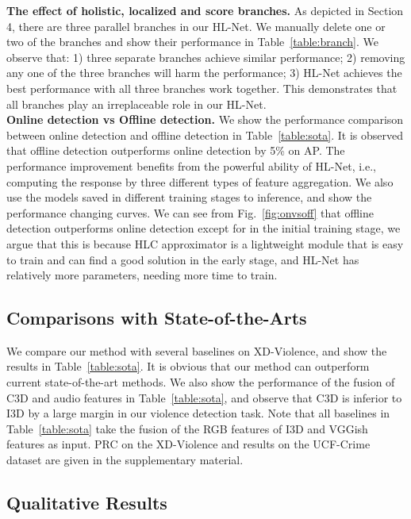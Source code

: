 \documentclass[runningheads]{llncs}
\begin{document}
\noindent\textbf{The effect of holistic, localized and score branches.} As depicted in Section 4, there are three parallel branches in our HL-Net. We manually delete one or two of the branches and show their performance in Table~\ref{table:branch}. We observe that: 1) three separate branches achieve similar performance; 2) removing any one of the three branches will harm the performance; 3) HL-Net achieves the best performance with all three branches work together. This demonstrates that all branches play an irreplaceable role in our HL-Net.\\
\noindent\textbf{Online detection vs Offline detection.} We show the performance comparison between online detection and offline detection in Table~\ref{table:sota}. It is observed that offline detection outperforms online detection by 5\% on AP. The performance improvement benefits from the powerful ability of HL-Net, i.e., computing the response by three different types of feature aggregation. We also use the models saved in different training stages to inference, and show the performance changing curves. We can see from  Fig.~\ref{fig:onvsoff} that offline detection outperforms online detection except for in the initial training stage, we argue that this is because HLC approximator is a lightweight module that is easy to train and can find a good solution in the early stage, and HL-Net has relatively more parameters, needing more time to train.
\subsection{Comparisons with State-of-the-Arts}
We compare our method with several baselines on XD-Violence, and show the results in Table~\ref{table:sota}. It is obvious that our method can outperform current state-of-the-art methods. We also show the performance of the fusion of C3D and audio features in Table~\ref{table:sota}, and observe that C3D is inferior to I3D by a large margin in our violence detection task. Note that all baselines in Table~\ref{table:sota} take the fusion of the RGB features of I3D and VGGish features as input. PRC on the XD-Violence and results on the UCF-Crime dataset are given in the supplementary material.

\subsection{Qualitative Results}
\end{document}
